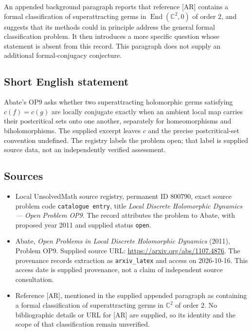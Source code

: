 \documentclass[11pt]{article}
\newcommand{\C}{\mathbb{C}}
\begin{document}
An appended background paragraph reports that reference [AR] contains a formal classification of superattracting germs in \(\operatorname{End}(\C^2,0)\) of order \(2\), and suggests that its methods could in principle address the general formal classification problem. It then introduces a more specific question whose statement is absent from this record. This paragraph does not supply an additional formal-conjugacy conjecture.
\subsection{Short English statement}
Abate's OP9 asks whether two superattracting holomorphic germs satisfying \(c(f)=c(g)\) are locally conjugate exactly when an ambient local map carries their postcritical sets onto one another, separately for homeomorphisms and biholomorphisms. The supplied excerpt leaves \(c\) and the precise postcritical-set convention undefined. The registry labels the problem open; that label is supplied source data, not an independently verified assessment.
\subsection{Sources}
\begin{itemize}
\item Local UnsolvedMath source registry, permanent ID \(800790\), exact source problem code \texttt{catalogue entry}, title \emph{Local Discrete Holomorphic Dynamics --- Open Problem OP9}. The record attributes the problem to Abate, with proposed year 2011 and supplied status \texttt{open}.
\item Abate, \emph{Open Problems in Local Discrete Holomorphic Dynamics} (2011), Problem OP9. Supplied source URL: \url{https://arxiv.org/abs/1107.4876}. The provenance records extraction as \texttt{arxiv\_latex} and access on 2026-10-16. This access date is supplied provenance, not a claim of independent source consultation.
\item Reference [AR], mentioned in the supplied appended paragraph as containing a formal classification of superattracting germs in \(\C^2\) of order \(2\). No bibliographic details or URL for [AR] are supplied, so its identity and the scope of that classification remain unverified.
\end{itemize}
\end{document}
